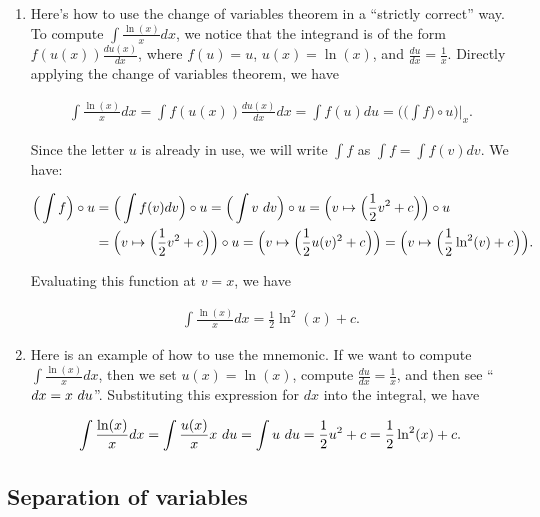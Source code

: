 \documentclass{article}
\begin{document}
\begin{enumerate}
    \item Here's how to use the change of variables theorem in a ``strictly correct'' way. To compute $\int \frac{\ln(x)}{x} dx$, we notice that the integrand is of the form $f(u(x)) \frac{du(x)}{dx}$, where $f(u) = u$, $u(x) = \ln(x)$, and $\frac{du}{dx} = \frac{1}{x}$. Directly applying the change of variables theorem, we have 
    
    \begin{align*}
        \int \frac{\ln(x)}{x} dx = \int f(u(x)) \frac{du(x)}{dx} dx = \int f(u) du = \Big(\Big(\int f\Big) \circ u\Big)\Big|_x.
    \end{align*}
    
    Since the letter $u$ is already in use, we will write $\int f$ as $\int f = \int f(v) dv$. We have:
    
    \begin{align*}
        \Big(\int f\Big) \circ u &= \Big(\int f(v) dv \Big) \circ u = \Big(\int v \text{ } dv \Big) \circ u = \Big( v \mapsto \Big( \frac{1}{2}v^2 + c \Big) \Big) \circ u \\
        &= \Big( v \mapsto \Big( \frac{1}{2}v^2 + c \Big) \Big) \circ u = \Big( v \mapsto \Big( \frac{1}{2}u(v)^2 + c \Big) \Big)
        =  \Big( v \mapsto \Big( \frac{1}{2}\ln^2(v) + c \Big) \Big).
    \end{align*}
    
    Evaluating this function at $v = x$, we have 
    
    \begin{align*}
        \int \frac{\ln(x)}{x} dx = \frac{1}{2} \ln^2(x) + c.
    \end{align*}
    
    \item Here is an example of how to use the mnemonic. If we want to compute $\int \frac{\ln(x)}{x} dx$, then we set $u(x) = \ln(x)$, compute $\frac{du}{dx} = \frac{1}{x}$, and then see ``$dx = x \text{ } du$''. Substituting this expression for $dx$ into the integral, we have
    
    \begin{align*}
        \int \frac{\ln(x)}{x} dx = \int \frac{u(x)}{x} x \text{ } du = \int u \text{ } du = \frac{1}{2} u^2 + c = \frac{1}{2}\ln^2(x) + c.
    \end{align*}
\end{enumerate}

\subsection*{Separation of variables}
\end{document}
